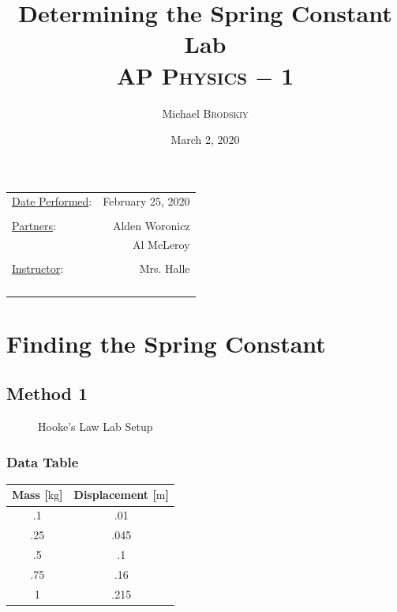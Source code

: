 \documentclass{article}
\title{Determining the Spring Constant Lab \\ AP \textsc{Physics} $-$ 1}
\author{Michael \textsc{Brodskiy}}
\date{March 2, 2020}
\begin{document}
\maketitle
\begin{center}
\begin{tabular}{l r}
\underline{Date Performed}: & February 25, 2020 \\\\ %
\underline{Partners}: & Alden Woronicz \\ & Al McLeroy \\\\
\underline{Instructor}: & Mrs. Halle \\\\\\\\\\ %
\end{tabular}
\end{center}
\newpage
    
\section{Finding the Spring Constant}

\subsection{Method 1}

\begin{figure}[H]
    
    \caption{Hooke's Law Lab Setup}
\end{figure}

\subsubsection{Data Table}

\begin{center}
\begin{tabular}{|c|c|}
\hline
    Mass [$\si{\kilo\gram}$] & Displacement [$\si{\meter}$] \\
\hline
    .1 & .01 \\
\hline
    .25 & .045 \\
\hline
    .5 & .1 \\
\hline
    .75 & .16 \\
\hline
    1 & .215 \\
\hline
\end{tabular}
\end{center}
\end{document}
